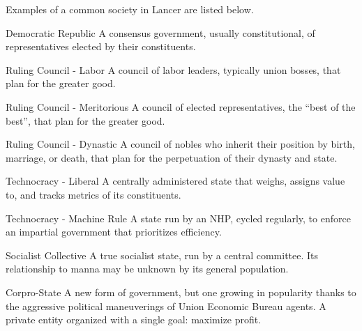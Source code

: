 Examples of a common society in Lancer are listed below.

 Democratic Republic                                   A consensus government, usually
                                                       constitutional, of representatives elected by
                                                       their constituents.

 Ruling Council - Labor                                A council of labor leaders, typically union
                                                       bosses, that plan for the greater good.

 Ruling Council - Meritorious                          A council of elected representatives, the
                                                       “best of the best”, that plan for the greater
                                                       good.

 Ruling Council - Dynastic                             A council of nobles who inherit their position
                                                       by birth, marriage, or death, that plan for the
                                                       perpetuation of their dynasty and state.

 Technocracy - Liberal                                 A centrally administered state that weighs,
                                                       assigns value to, and tracks metrics of its
                                                       constituents.

 Technocracy - Machine Rule                            A state run by an NHP, cycled regularly, to
                                                       enforce an impartial government that
                                                       prioritizes efficiency.

 Socialist Collective                                  A true socialist state, run by a central
                                                       committee. Its relationship to manna may be
                                                       unknown by its general population.

 Corpro-State                                          A new form of government, but one growing
                                                       in popularity thanks to the aggressive political
                                                       maneuverings of Union Economic Bureau
                                                       agents. A private entity organized with a
                                                       single goal: maximize profit.

